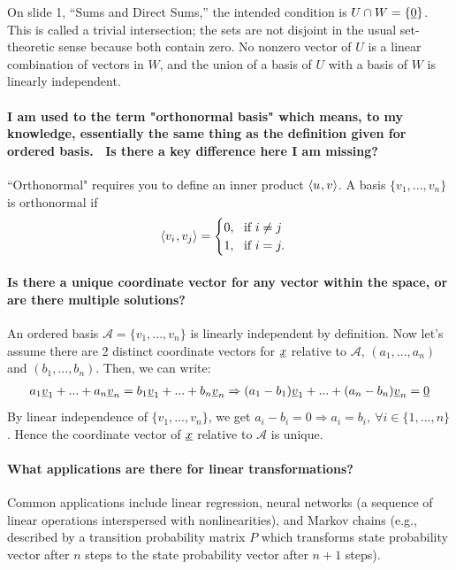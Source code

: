 \documentclass[10pt,english]{article}
\begin{document}
On slide 1, ``Sums and Direct Sums,'' the intended condition is $U\cap W=\{\underline{0}\}$.
This is called a trivial intersection; the sets are not disjoint in the usual set-theoretic sense because both contain zero.
No nonzero vector of $U$ is a linear combination of vectors in $W$, and the union of a basis of $U$ with a basis of $W$ is linearly independent.


\paragraph{I am used to the term "orthonormal basis" which means, to my knowledge, essentially the same thing as the definition given for ordered basis.  Is there a key difference here I am missing?}

``Orthonormal" requires you to define an inner product ${\langle  u  \mskip1mu ,  v  \rangle}$.
A basis $\{v_1,...,v_n\}$ is orthonormal if \[{\langle  v_i  \mskip1mu ,  v_j \rangle} = \begin{cases} 0,~~ \text{if}~ i\neq j\\ 1, ~~ \text{if}~i=j.\end{cases} \]

\paragraph{Is there a unique coordinate vector for any vector within the space, or are there multiple solutions?}

An ordered basis $\mathcal{A}=\{v_1,...,v_n\}$ is linearly independent by definition. Now let's assume there are 2 distinct coordinate vectors for $\underline{x}$ relative to $\mathcal{A}$, $(a_1,...,a_n)$ and $(b_1,...,b_n)$.
Then, we can write:
\begin{align}
    a_1\underline{v}_1 + ... + a_n\underline{v}_n = b_1\underline{v}_1 + ... + b_n \underline{v}_n \Rightarrow (a_1-b_1)\underline{v}_1 + ... + (a_n-b_n)\underline{v}_n = \underline{0}
\end{align}
By linear independence of $\{v_1,...,v_n\}$, we get $a_i-b_i = 0 \Rightarrow a_i = b_i,~\forall i \in \{1,...,n\}$. Hence the coordinate vector of $\underline{x}$ relative to $\mathcal{A}$ is unique.

\paragraph{What applications are there for linear transformations?}
Common applications include linear regression, neural networks (a sequence of linear operations interspersed with nonlinearities), and Markov chains (e.g., described by a transition probability matrix $P$ which transforms state probability vector after $n$ steps to the state probability vector after $n+1$ steps).
\end{document}
